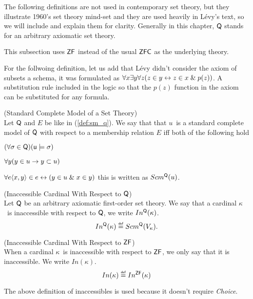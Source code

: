 The following definitions are not used in contemporary set theory, but they illustrate 1960's set theory mind-set and they are used heavily in Lévy's text, so we will include and explain them for clarity. Generally in this chapter, $\sf{Q}$ stands for an arbitrary axiomatic set theory. %


This subsection uses $\sf{ZF}$ instead of the usual $\sf{ZFC}$ as the underlying theory. %

For the follwoing definition, let us add that Lévy didn't consider the axiom of subsets a schema, it was formulated as $\forall x \exists y \forall z (z \in y \leftrightarrow z \in x \mathrel{\&} p(z))$. A substitution rule included in the logic so that the $p(z)$ function in the axiom can be substituted for any formula. 

\begin{definition}{(Standard Complete Model of a Set Theory)}\label{def:scm_q}\\
Let $\sf{Q}$ and $E$ be like in (\ref{def:sm_q}). We say that that $u$ is a standard complete model of $\sf{Q}$ with respect to a membership relation $E$ iff both of the following hold
\bce[(i)]
\item $(\forall \sigma \in \sf{Q})(u \models \sigma)$
\item $\forall y (y \in u \rightarrow y \subset u) $
\item $\forall e \langle x, y \rangle \in e \leftrightarrow (y \in u \mathrel{\&} x \in y)$
\ece
this is written as $Scm^{\sf{Q}}(u)$.
\end{definition}

\begin{definition}{(Inaccessible Cardinal With Respect to $\sf{Q}$)}\label{def:levy_inaccessible_q}\\
Let $\sf{Q}$ be an arbitrary axiomatic first-order set theory. We say that a cardinal $\kappa$ is inaccessible with respect to $\sf{Q}$, we write $In^{\sf{Q}}(\kappa)$.
\begin{equation}
In^{\sf{Q}}(\kappa) \defeq Scm^{\sf{Q}}(V_\kappa).
\end{equation}
\end{definition}

\begin{definition}{(Inaccessible Cardinal With Respect to $\sf{ZF}$)}\label{def:levy_inaccessible}\\
When a cardinal $\kappa$ is inaccessible with respect to $\sf{ZF}$, we only say that it is inaccessible. We write $In(\kappa)$.
\begin{equation}
In(\kappa) \defeq In^{\sf{ZF}}(\kappa)
\end{equation}
\end{definition}
The above definition of inaccessibles is used because it doesn't require \emph{Choice}.

